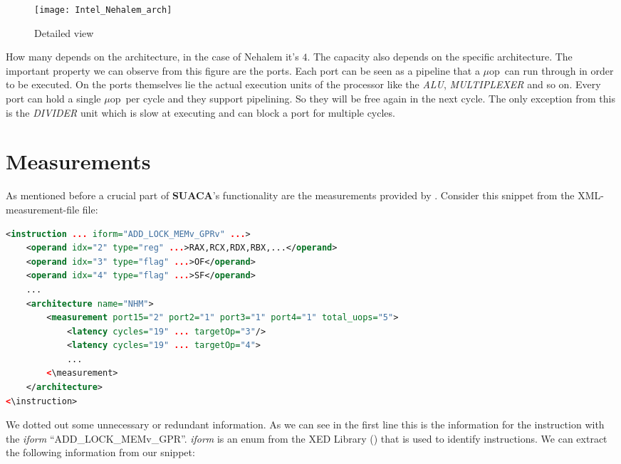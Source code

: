 \documentclass[a4paper,12pt,titlepage, twoside]{report}
\newcommand{\suaca}{\textbf{SUACA}}
\newcommand{\microop}{$\mu$op}
\begin{document}
\begin{wrapfigure}[15]{r}{0.6\textwidth}
    \texttt{[image: Intel\_Nehalem\_arch]}
    \caption{Detailed view}
    \label{fig:NHMdetail}
\end{wrapfigure}

 How many depends on the architecture, in the case of Nehalem it's $4$. The capacity also depends on the specific architecture. The important property we can observe from this figure are the ports. Each port can be seen as a pipeline that a \microop\ can run through in order to be executed. On the ports themselves lie the actual execution units of the processor like the \emph{ALU}, \emph{MULTIPLEXER} and so on. Every port can hold a single \microop\ per cycle and they support pipelining. So they will be free again in the next cycle. The only exception from this is the \emph{DIVIDER} unit which is slow at executing and can block a port for multiple cycles.

\section{Measurements}
\label{sec:measurements}

As mentioned before a crucial part of \suaca's functionality are the measurements provided by \cite{Andreas}. Consider this snippet from the XML-measurement-file file:


\begin{lstlisting}[language=XML, basicstyle=\ttfamily\scriptsize, breaklines=false]
<instruction ... iform="ADD_LOCK_MEMv_GPRv" ...>
    <operand idx="2" type="reg" ...>RAX,RCX,RDX,RBX,...</operand>
    <operand idx="3" type="flag" ...>OF</operand>
    <operand idx="4" type="flag" ...>SF</operand>
    ...
    <architecture name="NHM">
        <measurement port15="2" port2="1" port3="1" port4="1" total_uops="5">
            <latency cycles="19" ... targetOp="3"/>
            <latency cycles="19" ... targetOp="4">
            ...
        <\measurement>
    </architecture>
<\instruction>
\end{lstlisting}

We dotted out some unnecessary or redundant information. As we can see in the first line this is the information for the instruction with the \emph{iform} ``ADD\_LOCK\_MEMv\_GPR''. \emph{iform} is an enum from the XED Library (\cite{xed}) that is used to identify instructions. We can extract the following information from our snippet:
\end{document}
